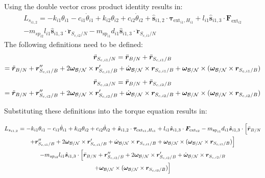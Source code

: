 \documentclass[paper]{aiaaNew}
\begin{document}
	Using the double vector cross product identity results in:
	\begin{multline}
	L_{s_{i1,2}} = - k_{i1} \theta_{i1} - c_{i1}\dot{\theta}_{i1} +  k_{i2} \theta_{i2} + c_{i2} \dot\theta_{i2} + \hat{\bm s}_{i1,2} \cdot \bm \tau_{\text{ext}_{i1},H_{i1}} + l_{i1} \hat{\bm s}_{i1,3} \cdot \bm F_{\text{ext}_{i2}} \\
	- m_{sp_{i2}} l_{i1} \hat{\bm s}_{i1,3} \cdot \ddot{\bm{r}}_{S_{c,i2}/N}
	- m_{\text{sp}_{i1}} d_{i1} \hat{\bm s}_{i1,3} \cdot  \ddot{\bm r}_{S_{c,i1}/N}
	\end{multline}
	The following definitions need to be defined:
	\begin{multline}
	\ddot{\bm r}_{S_{c,i1}/N} = \ddot{\bm{r}}_{B/N} + \ddot{\bm r}_{S_{c,i1}/B} \\ 
	= \ddot{\bm{r}}_{B/N} + \bm{r}''_{S_{c,i1}/B} + 2 \bm\omega_{\cal B/N} \times \bm{r}'_{S_{c,i1}/B} +  \dot{\bm\omega}_{\cal B/N} \times \bm{r}_{S_{c,i1}/B} + \bm\omega_{\cal B/N} \times (\bm\omega_{\cal B/N} \times \bm{r}_{S_{c,i1}/B})
	\end{multline}
	\begin{multline}
	\ddot{\bm r}_{S_{c,i2}/N} = \ddot{\bm{r}}_{B/N} + \ddot{\bm r}_{S_{c,i2}/B} \\
	= \ddot{\bm{r}}_{B/N} + \bm{r}''_{S_{c,i2}/B} + 2 \bm\omega_{\cal B/N} \times \bm{r}'_{S_{c,i2}/B} +  \dot{\bm\omega}_{\cal B/N} \times \bm{r}_{S_{c,i2}/B} + \bm\omega_{\cal B/N} \times (\bm\omega_{\cal B/N} \times \bm{r}_{S_{c,i2}/B})
	\end{multline}

	Substituting these definitions into the torque equation results in:

	
	\begin{multline}
L_{s_{i1,2}} = - k_{i1} \theta_{i1} - c_{i1}\dot{\theta}_{i1} +  k_{i2} \theta_{i2} + c_{i2} \dot\theta_{i2} + \hat{\bm s}_{i1,2} \cdot \bm \tau_{\text{ext}_{i1},H_{i1}} + l_{i1} \hat{\bm s}_{i1,3} \cdot \bm F_{\text{ext}_{i2}} 
- m_{\text{sp}_{i1}} d_{i1} \hat{\bm s}_{i1,3} \cdot \Big[\ddot{\bm{r}}_{B/N} \\
+ \bm{r}''_{S_{c,i1}/B} + 2 \bm\omega_{\cal B/N} \times \bm{r}'_{S_{c,i1}/B} +  \dot{\bm\omega}_{\cal B/N} \times \bm{r}_{S_{c,i1}/B}
 + \bm\omega_{\cal B/N} \times (\bm\omega_{\cal B/N} \times \bm{r}_{S_{c,i1}/B})\Big]\\
 - m_{sp_{i2}} l_{i1} \hat{\bm s}_{i1,3} \cdot \Big[\ddot{\bm{r}}_{B/N} + \bm{r}''_{S_{c,i2}/B} + 2 \bm\omega_{\cal B/N} \times \bm{r}'_{S_{c,i2}/B} +  \dot{\bm\omega}_{\cal B/N} \times \bm{r}_{S_{c,i2}/B} \\
 + \bm\omega_{\cal B/N} \times (\bm\omega_{\cal B/N} \times \bm{r}_{S_{c,i2}/B})\Big]
\end{multline}
\end{document}
